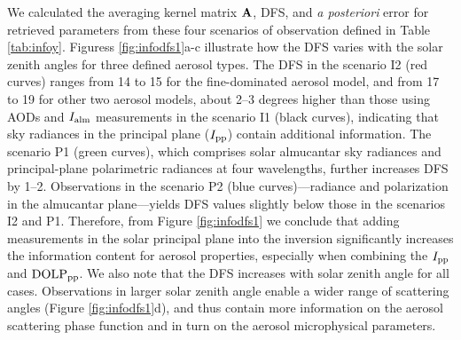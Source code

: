 We calculated the averaging kernel matrix $\mathbf{A}$, DFS, and \textit{a
posteriori} error for retrieved parameters from these four scenarios of 
observation defined in Table \ref{tab:infoy}. Figuress \ref{fig:infodfs1}a-c 
illustrate how the DFS varies with the solar zenith angles for
three defined aerosol types. The DFS in the scenario I2 (red curves) ranges
from 14 to 15 for the fine-dominated aerosol model, and from 17 to 19 for other
two aerosol models, about 2–3 degrees higher than those using AODs and $I_\text{alm}$
measurements in the scenario I1 (black curves), indicating that sky radiances
in the principal plane ($I_\text{pp}$) contain additional information. The scenario P1
(green curves), which comprises solar almucantar sky radiances and
principal-plane polarimetric radiances at four wavelengths, further increases
DFS by 1–2. Observations in the scenario P2 (blue curves)—radiance and
polarization in the almucantar plane—yields DFS values slightly below those in
the scenarios I2 and P1. Therefore, from Figure \ref{fig:infodfs1} we conclude
that adding measurements in the solar principal plane into the inversion 
significantly increases the information content for aerosol properties, 
especially when combining the $I_\text{pp}$ and $\text{DOLP}_\text{pp}$. We also note that the 
DFS increases with solar zenith angle for all cases. Observations in larger 
solar zenith angle enable a wider range of scattering angles (Figure
\ref{fig:infodfs1}d), and thus contain more information
on the aerosol scattering phase function and in turn on the aerosol
microphysical parameters.

